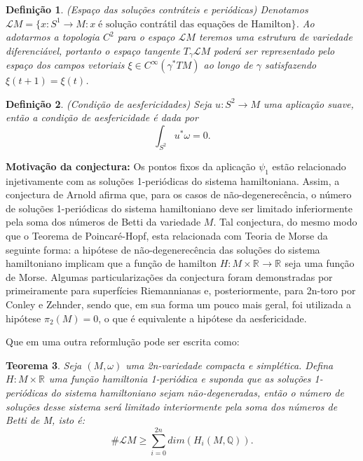 \documentclass[12pt]{book}
\newtheorem{teorema}{Teorema}[section]
\newtheorem{definicao}[teorema]{Definição}
\newcommand{\circulo}{S^{1}}
\newcommand{\real}[1]{\mathbb{R}^{#1}}
\newcommand{\solucoesperiodicascontrateis}{\mathcal{L}M}
\begin{document}
	\begin{definicao}\label{definicao_solucoes_periodicas_contratei}
		(Espaço das soluções contráteis e periódicas) Denotamos $\solucoesperiodicascontrateis = \{x:\circulo \to M: x \; \text{é solução contrátil das equações de Hamilton} \}$. Ao adotarmos a topologia $C^{2}$ para o espaço $\solucoesperiodicascontrateis$ teremos uma estrutura de variedade diferenciável, portanto o espaço tangente $T_{\gamma}\solucoesperiodicascontrateis$ poderá ser representado pelo espaço dos campos vetoriais $\xi \in  C^{\infty}(\gamma^{*}TM)$ ao longo de $\gamma$ satisfazendo $\xi(t+1) = \xi(t)$.
	\end{definicao}	
	
	\begin{definicao}
		(Condição de aesfericidades) Seja $u:S^{2} \to M$ uma aplicação suave, então a condição de aesfericidade é dada por 
		$$
		\int_{S^{2}} u^{*}\omega = 0.
		$$
	\end{definicao}
	
	\textbf{Motivação da conjectura:} Os pontos fixos da aplicação $\psi_{1}$ estão relacionado injetivamente com as soluções 1-periódicas do sistema hamiltoniana. Assim, a conjectura de Arnold afirma que, para os casos de não-degenerecência, o número de soluções 1-periódicas do sistema hamiltoniano deve ser limitado inferiormente pela soma dos números de Betti da variedade $M$. Tal conjectura, do mesmo modo que o Teorema de Poincaré-Hopf, esta relacionada com Teoria de Morse da seguinte forma: a hipótese de não-degenerecência das soluções do sistema hamiltoniano implicam que a função de hamilton $H: M \times \real{} \to \real{}$ seja uma função de Morse. Algumas particularizações da conjectura foram demonstradas por primeiramente para superfícies Riemannianas e, posteriormente, para 2n-toro por Conley e Zehnder, sendo que, em sua forma um pouco mais geral, foi utilizada a hipótese $\pi_{2}(M)=0$, o que é equivalente a hipótese da aesfericidade.

	Que em uma outra reformlução pode ser escrita como:
	
	\begin{teorema}
		Seja $(M,\omega)$ uma 2n-variedade compacta e simplética. Defina $H:M\times \real{}$ uma função hamiltonia 1-periódica e suponda que as soluções 1-periódicas do sistema hamiltoniano sejam não-degeneradas, então o número de soluções desse sistema será limitado interiormente pela soma dos números de Betti de M, isto é:
		$$
		\#\solucoesperiodicascontrateis \geq \sum_{i=0}^{2n}dim(H_{i}(M, \mathbb{Q})).
		$$
	\end{teorema}
	
\end{document}
